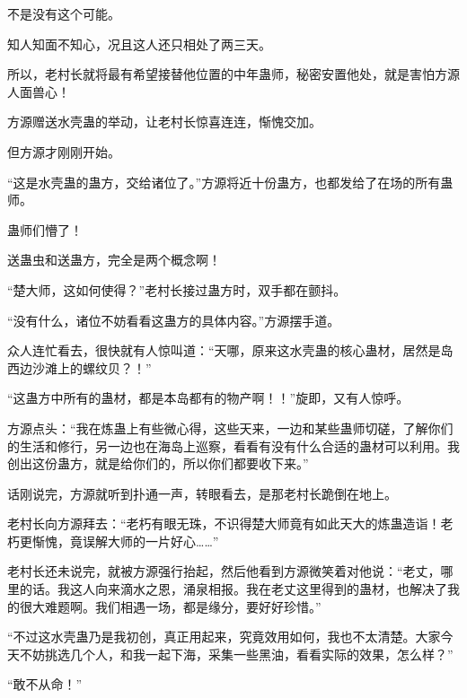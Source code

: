 \begin{this_body}
不是没有这个可能。

知人知面不知心，况且这人还只相处了两三天。

所以，老村长就将最有希望接替他位置的中年蛊师，秘密安置他处，就是害怕方源人面兽心！

方源赠送水壳蛊的举动，让老村长惊喜连连，惭愧交加。

但方源才刚刚开始。

“这是水壳蛊的蛊方，交给诸位了。”方源将近十份蛊方，也都发给了在场的所有蛊师。

蛊师们懵了！

送蛊虫和送蛊方，完全是两个概念啊！

“楚大师，这如何使得？”老村长接过蛊方时，双手都在颤抖。

“没有什么，诸位不妨看看这蛊方的具体内容。”方源摆手道。

众人连忙看去，很快就有人惊叫道：“天哪，原来这水壳蛊的核心蛊材，居然是岛西边沙滩上的螺纹贝？！”

“这蛊方中所有的蛊材，都是本岛都有的物产啊！！”旋即，又有人惊呼。

方源点头：“我在炼蛊上有些微心得，这些天来，一边和某些蛊师切磋，了解你们的生活和修行，另一边也在海岛上巡察，看看有没有什么合适的蛊材可以利用。我创出这份蛊方，就是给你们的，所以你们都要收下来。”

话刚说完，方源就听到扑通一声，转眼看去，是那老村长跪倒在地上。

老村长向方源拜去：“老朽有眼无珠，不识得楚大师竟有如此天大的炼蛊造诣！老朽更惭愧，竟误解大师的一片好心……”

老村长还未说完，就被方源强行抬起，然后他看到方源微笑着对他说：“老丈，哪里的话。我这人向来滴水之恩，涌泉相报。我在老丈这里得到的蛊材，也解决了我的很大难题啊。我们相遇一场，都是缘分，要好好珍惜。”

“不过这水壳蛊乃是我初创，真正用起来，究竟效用如何，我也不太清楚。大家今天不妨挑选几个人，和我一起下海，采集一些黑油，看看实际的效果，怎么样？”

“敢不从命！”

\end{this_body}

